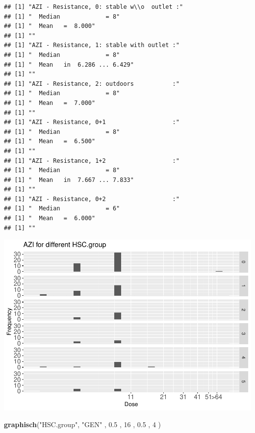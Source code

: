 \documentclass[
]{article}
\newenvironment{Shaded}{\begin{snugshade}}{\end{snugshade}}
\newcommand{\DecValTok}[1]{\textcolor[rgb]{0.00,0.00,0.81}{#1}}
\newcommand{\FloatTok}[1]{\textcolor[rgb]{0.00,0.00,0.81}{#1}}
\newcommand{\KeywordTok}[1]{\textcolor[rgb]{0.13,0.29,0.53}{\textbf{#1}}}
\newcommand{\NormalTok}[1]{#1}
\newcommand{\StringTok}[1]{\textcolor[rgb]{0.31,0.60,0.02}{#1}}
\begin{document}
\begin{verbatim}
## [1] "AZI - Resistance, 0: stable w\\o  outlet :"
## [1] "  Median             = 8"
## [1] "  Mean   =  8.000"
## [1] ""
## [1] "AZI - Resistance, 1: stable with outlet :"
## [1] "  Median             = 8"
## [1] "  Mean   in  6.286 ... 6.429"
## [1] ""
## [1] "AZI - Resistance, 2: outdoors           :"
## [1] "  Median             = 8"
## [1] "  Mean   =  7.000"
## [1] ""
## [1] "AZI - Resistance, 0+1                   :"
## [1] "  Median             = 8"
## [1] "  Mean   =  6.500"
## [1] ""
## [1] "AZI - Resistance, 1+2                   :"
## [1] "  Median             = 8"
## [1] "  Mean   in  7.667 ... 7.833"
## [1] ""
## [1] "AZI - Resistance, 0+2                   :"
## [1] "  Median             = 6"
## [1] "  Mean   =  6.000"
## [1] ""
\end{verbatim}

\includegraphics{Verteilungen_files/figure-latex/unnamed-chunk-47-1.pdf}

\begin{Shaded}
\begin{Highlighting}[]
   \KeywordTok{graphisch}\NormalTok{(}\StringTok{"HSC.group"}\NormalTok{, }\StringTok{"GEN"}\NormalTok{ , }\FloatTok{0.5}\NormalTok{  ,  }\DecValTok{16}\NormalTok{   ,   }\FloatTok{0.5}\NormalTok{  ,   }\DecValTok{4}\NormalTok{    )}
\end{Highlighting}
\end{Shaded}
\end{document}
